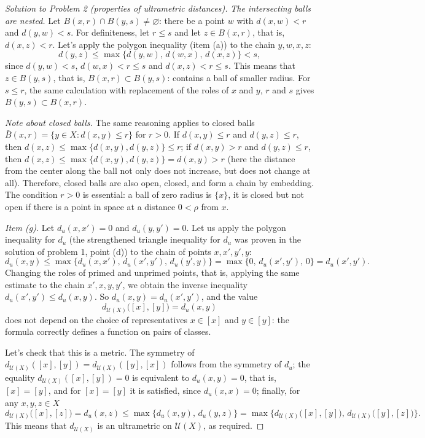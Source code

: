 \documentclass[a4paper,12pt]{report}
\begin{document}
\begin{proof}[Solution to Problem \textup{2} \textup{(}properties of ultrametric distances\textup{)}]
\textit{The intersecting balls are nested.} Let $B(x,r)\cap B(y,s)\ne\varnothing$\textup{:} there be a point $w$ with $d(x,w)<r$ and $d(y,w)<s$. For definiteness, let $r\le s$ and let $z\in B(x,r)$, that is, $d(x,z)<r$. Let's apply the polygon inequality \textup{(}item \textup{(a)}\textup{)} to the chain $y,w,x,z$\textup{:}
\[
d(y,z)\le\max\bigl\{d(y,w),\,d(w,x),\,d(x,z)\bigr\}<s ,
\]
since $d(y,w)<s$, $d(w,x)<r\le s$ and $d(x,z)<r\le s$. This means that $z\in B(y,s)$, that is, $B(x,r)\subset B(y,s)$\textup{:} contains a ball of smaller radius. For $s\le r$, the same calculation with replacement of the roles of $x$ and $y$, $r$ and $s$ gives $B(y,s)\subset B(x,r)$.

\textit{Note about closed balls.} The same reasoning applies to closed balls $\bar B(x,r)=\{y\in X:d(x,y)\le r\}$ for $r>0$. If $d(x,y)\le r$ and $d(y,z)\le r$, then $d(x,z)\le\max\{d(x,y),d(y,z)\}\le r$\textup{;} if $d(x,y)>r$ and $d(y,z)\le r$, then $d(x,z)\le\max\{d(x,y),d(y,z)\}=d(x,y)>r$ \textup{(}here the distance from the center along the ball not only does not increase, but does not change at all\textup{)}. Therefore, closed balls are also open, closed, and form a chain by embedding. The condition $r>0$ is essential\textup{:} a ball of zero radius is $\{x\}$, it is closed but not open if there is a point in space at a distance $0<\rho$ from $x$.

\textit{Item \textup{(g)}.} Let $d_u(x,x')=0$ and $d_u(y,y')=0$. Let us apply the polygon inequality for $d_u$ \textup{(}the strengthened triangle inequality for $d_u$ was proven in the solution of problem \textup{1}, point \textup{(d)}\textup{)} to the chain of points $x,x',y',y$\textup{:}
\[
d_u(x,y)\le\max\bigl\{d_u(x,x'),\,d_u(x',y'),\,d_u(y',y)\bigr\}
=\max\bigl\{0,\,d_u(x',y'),\,0\bigr\}=d_u(x',y') .
\]
Changing the roles of primed and unprimed points, that is, applying the same estimate to the chain $x',x,y,y'$, we obtain the inverse inequality $d_u(x',y')\le d_u(x,y)$. So $d_u(x,y)=d_u(x',y')$, and the value
\[
d_{\mathcal U(X)}\bigl([x],[y]\bigr)=d_u(x,y)
\]
does not depend on the choice of representatives $x\in[x]$ and $y\in[y]$\textup{:} the formula correctly defines a function on pairs of classes.

Let's check that this is a metric. The symmetry of $d_{\mathcal U(X)}([x],[y])=d_{\mathcal U(X)}([y],[x])$ follows from the symmetry of $d_u$\textup{;} the equality $d_{\mathcal U(X)}([x],[y])=0$ is equivalent to $d_u(x,y)=0$, that is, $[x]=[y]$, and for $[x]=[y]$ it is satisfied, since $d_u(x,x)=0$\textup{;} finally, for any $x,y,z\in X$
\[
d_{\mathcal U(X)}\bigl([x],[z]\bigr)=d_u(x,z)\le\max\bigl\{d_u(x,y),\,d_u(y,z)\bigr\}
=\max\bigl\{d_{\mathcal U(X)}\bigl([x],[y]\bigr),\,d_{\mathcal U(X)}\bigl([y],[z]\bigr)\bigr\} .
\]
This means that $d_{\mathcal U(X)}$ is an ultrametric on $\mathcal U(X)$, as required.


\end{proof}
\end{document}
